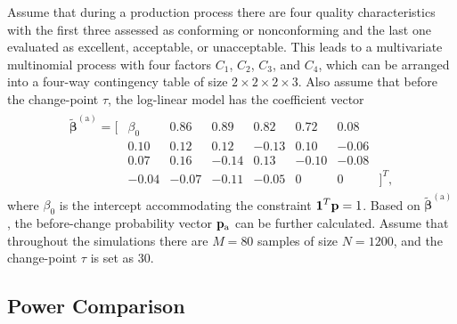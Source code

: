 Assume that during a production process there are four quality characteristics with
the first three assessed as conforming or nonconforming and the last one evaluated
as excellent, acceptable, or unacceptable. This leads to a multivariate multinomial
process with four factors $C_1$, $C_2$, $C_3$, and $C_4$, which can be arranged into
a four-way contingency table of size $2\times2\times2\times3$. Also assume that
before the change-point $\tau$, the log-linear model has the coefficient vector
\begin{eqnarray}
\begin{array}{rrrrrrrrrl}
\widetilde{\bm{\beta}}^{(\mathrm{a})}=[ & \beta_0 & 0.86 & 0.89
& 0.82 & 0.72 & 0.08 & \\
& 0.10 & 0.12 & 0.12 & -0.13 & 0.10 & -0.06 & \\
& 0.07 & 0.16 & -0.14 & 0.13 & -0.10 & -0.08 & \\
& -0.04 & -0.07 & -0.11 & -0.05 & 0 & 0 & ]^T,
\end{array}
\nonumber
\end{eqnarray}
where $\beta_0$ is the intercept accommodating the constraint $\boldsymbol{1}^T{\bf p}=1$.
Based on $\widetilde{\bm{\beta}}^{(\mathrm{a})}$, the before-change probability
vector ${\bf p}_{\mathrm{a}}$ can be further calculated. Assume that throughout the
simulations there are $M=80$ samples of size $N=1200$, and the change-point $\tau$
is set as 30.


\subsection{Power Comparison}


